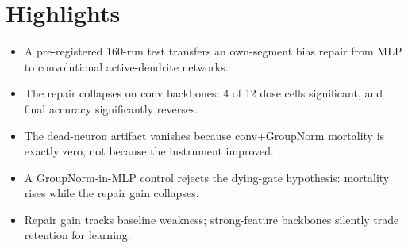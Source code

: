 \documentclass{article}
\begin{document}
\section*{Highlights}

\begin{itemize}
\item A pre-registered 160-run test transfers an own-segment bias
repair from MLP to convolutional active-dendrite networks.
\item The repair collapses on conv backbones: 4 of 12 dose cells
significant, and final accuracy significantly reverses.
\item The dead-neuron artifact vanishes because conv+GroupNorm
mortality is exactly zero, not because the instrument improved.
\item A GroupNorm-in-MLP control rejects the dying-gate hypothesis:
mortality rises while the repair gain collapses.
\item Repair gain tracks baseline weakness; strong-feature backbones
silently trade retention for learning.
\end{itemize}
\end{document}
